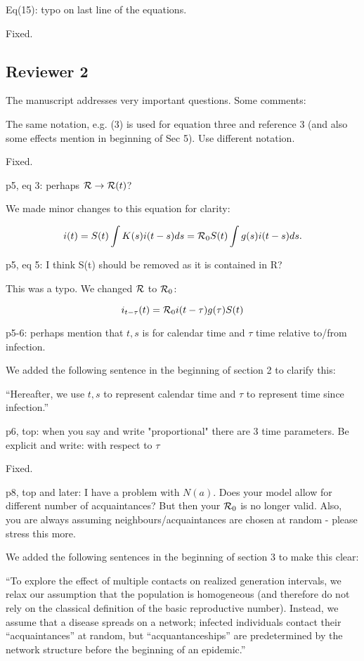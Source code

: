 \documentclass[12pt]{article}
\newcommand{\RR}{\ensuremath{{\cal R}}}
\newcommand{\rev}{\subsection*}
\newcommand{\revtext}{\textsf}
\begin{document}
\revtext{Eq(15): typo on last line of the equations.}

Fixed.

\rev{Reviewer 2}

\revtext{The manuscript addresses very important questions. Some comments:}

\revtext{The same notation, e.g. (3) is used for equation three and reference 3 (and also some effects mention in beginning of Sec 5). Use different notation.}

Fixed.

\revtext{p5, eq 3: perhaps $\RR \rightarrow \RR(t)$?}

We made minor changes to this equation for clarity:

\begin{equation*}
i(t) = S(t) \int K(s) i(t-s) ds = \RR_0 S(t) \int g(s) i(t-s) ds.
\end{equation*}

\revtext{p5, eq 5: I think S(t) should be removed as it is contained in R?}

This was a typo. We changed $\RR$ to $\RR_0$:

\begin{equation*}
i_{t-\tau}(t) = \RR_0 i(t-\tau) g(\tau) S(t)
\end{equation*}

\revtext{p5-6: perhaps mention that $t, s$ is for calendar time and $\tau$ time relative to/from infection.}

We added the following sentence in the beginning of section 2 to clarify this:

``Hereafter, we use $t, s$ to represent calendar time and $\tau$ to
represent time since infection.''

\revtext{p6, top: when you say and write "proportional" there are 3 time parameters. Be explicit and write: with respect to $\tau$}

Fixed.

\revtext{p8, top and later: I have a problem with $N(a)$. Does your model allow for different number of acquaintances? But then your $\RR_0$ is no longer valid. Also, you are always assuming neighbours/acquaintances are chosen at random - please stress this more.}

We added the following sentences in the beginning of section 3 to make this clear:

``To explore the effect of multiple contacts on realized generation intervals, we relax our assumption that the population is homogeneous (and therefore do not rely on the classical definition of the basic reproductive number).
Instead, we assume that a disease spreads on a network;
infected individuals contact their ``acquaintances'' at random, but ``acquantanceships'' are predetermined by the network structure before the beginning of an epidemic.''
\end{document}

